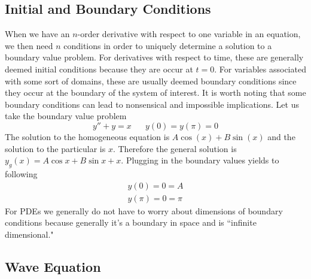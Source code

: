 \documentclass{article}
\newcommand{\twen}{\hspace{20pt}}
\theoremstyle{definition}
\begin{document}
\subsection{Initial and Boundary Conditions}
When we have an $n$-order derivative with respect to one variable in an equation, we then need $n$ conditions in order to uniquely determine a solution to a boundary value problem. For derivatives with respect to time, these are generally deemed initial conditions because they are occur at $t=0$. For variables associated with some sort of domains, these are usually deemed boundary conditions since they occur at the boundary of the system of interest. It is worth noting that some boundary conditions can lead to nonsensical and impossible implications. Let us take the boundary value problem 
\begin{equation*}
    y''+y=x \twen y(0)=y(\pi)=0
\end{equation*}
The solution to the homogeneous equation is $A\cos(x)+B\sin(x)$ and the solution to the particular is $x$. Therefore the general solution is $y_g(x)=A\cos x+B\sin x+x$. Plugging in the boundary values yields to following 
\begin{equation*}
    \begin{split}
        y(0)=0=A\\
        y(\pi)=0=\pi
    \end{split}
\end{equation*}
For PDEs we generally do not have to worry about dimensions of boundary conditions because generally it's a boundary in space and is ``infinite dimensional."
\subsection{Wave Equation}
\end{document}
